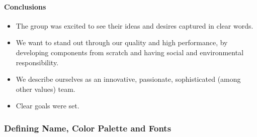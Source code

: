 \documentclass{article}
\begin{document}
\paragraph{Conclusions}
\begin{itemize}
    \item The group was excited to see their ideas and desires captured in clear words.
    \item We want to stand out through our quality and high performance, by developing components from scratch and having social and environmental responsibility.
    \item We describe ourselves as an innovative, passionate, sophisticated (among other values) team. 
    \item Clear goals were set.
    
\end{itemize}

\subsubsection{Defining Name, Color Palette and Fonts}
\end{document}
